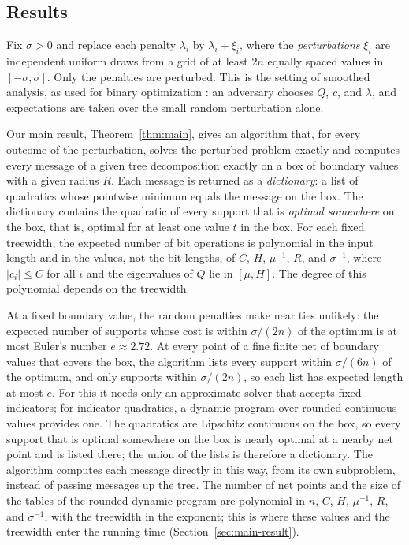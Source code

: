 \subsection{Results}
Fix $\sigma>0$ and replace each penalty $\lambda_i$ by
$\lambda_i+\xi_i$, where the \emph{perturbations} $\xi_i$ are
independent uniform draws from a grid of at least $2n$ equally spaced
values in $[-\sigma,\sigma]$. Only the penalties are perturbed. This is
the setting of smoothed analysis, as used for binary optimization
\cite{BeierVocking,RoglinTeng}: an adversary chooses $Q$, $c$, and
$\lambda$, and expectations are taken over the small random
perturbation alone.

Our main result, Theorem~\ref{thm:main}, gives an algorithm that, for
every outcome of the perturbation, solves the perturbed problem exactly
and computes every message of a given tree decomposition exactly on a
box of boundary values with a given radius $R$. Each message is
returned as a \emph{dictionary}: a list of quadratics whose pointwise
minimum equals the message on the box. The dictionary contains the
quadratic of every support that is \emph{optimal somewhere} on the box,
that is, optimal for at least one value $t$ in the box. For each fixed
treewidth, the expected number of bit operations is polynomial in the
input length and in the values, not the bit lengths, of $C$, $H$,
$\mu^{-1}$, $R$, and $\sigma^{-1}$, where $|c_i|\le C$ for all $i$ and
the eigenvalues of $Q$ lie in $[\mu,H]$. The degree of this polynomial
depends on the treewidth.

At a fixed boundary value, the random penalties make near ties
unlikely: the expected number of supports whose cost is within
$\sigma/(2n)$ of the optimum is at most Euler's number $e\approx2.72$.
At every point of a fine finite net of boundary values that covers the
box, the algorithm lists every support within $\sigma/(6n)$ of the
optimum, and only supports within $\sigma/(2n)$, so each list has
expected length at most $e$. For this it needs only an approximate
solver that accepts fixed indicators; for indicator quadratics, a
dynamic program over rounded continuous values provides one. The
quadratics are Lipschitz continuous on the box, so every support that is
optimal somewhere on the box is nearly optimal at a nearby net point and
is listed there; the union of the lists is therefore a dictionary. The
algorithm computes each message directly in this way, from its own
subproblem, instead of passing messages up the tree. The number of net
points and the size of the tables of the rounded dynamic program are
polynomial in $n$, $C$, $H$, $\mu^{-1}$, $R$, and $\sigma^{-1}$, with the
treewidth in the exponent; this is where these values and the treewidth
enter the running time (Section~\ref{sec:main-result}).

